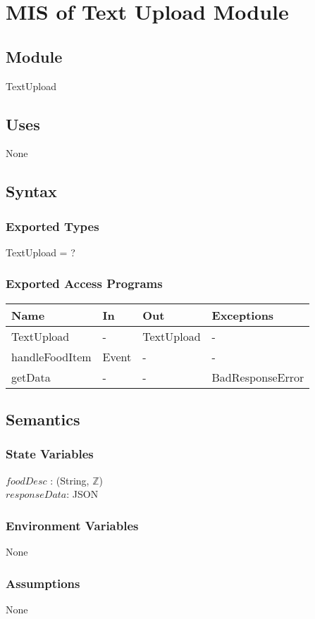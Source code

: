 \documentclass[12pt, titlepage]{article}
\begin{document}
\newpage

\section{MIS of Text Upload Module} \label{TextUpload}
\subsection{Module}
TextUpload
\subsection{Uses}
None
\subsection{Syntax}
\subsubsection{Exported Types}
TextUpload = ?
\subsubsection{Exported Access Programs}
\begin{center}
	\begin{tabular}{p{3cm} p{4cm} p{4cm} p{2cm}}
		\hline
		\textbf{Name} & \textbf{In} & \textbf{Out} & \textbf{Exceptions} \\
		\hline
		TextUpload & - & TextUpload & - \\
		handleFoodItem & Event & - & - \\
		getData & - & - & BadResponseError \\
		\hline
	\end{tabular}
\end{center}
\subsection{Semantics}
\subsubsection{State Variables}
$foodDesc$ : (String, $\mathbb{Z}$)\\
$responseData$: JSON
\subsubsection{Environment Variables}
None
\subsubsection{Assumptions}
None
\end{document}
